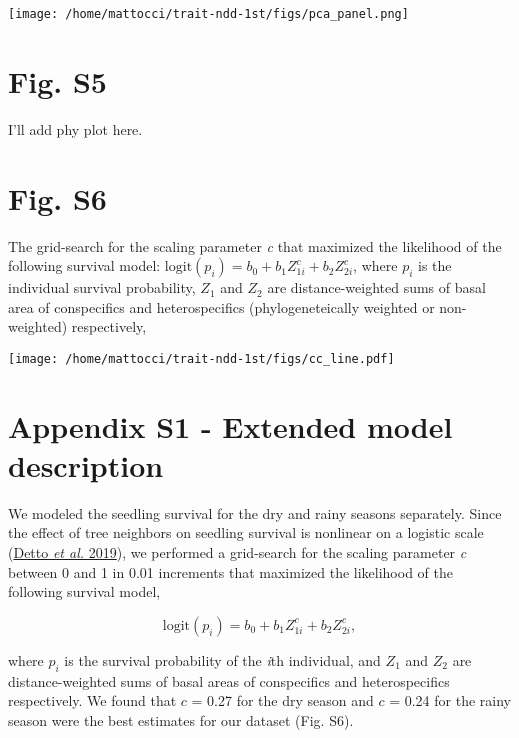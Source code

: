 \documentclass[
  12pt,
  letterpaper,
  DIV=11,
  numbers=noendperiod]{scrartcl}
\begin{document}
\texttt{[image: /home/mattocci/trait-ndd-1st/figs/pca\_panel.png]}

\newpage

\hypertarget{fig.-s5}{%
\section{Fig. S5}\label{fig.-s5}}

I'll add phy plot here.

\newpage

\hypertarget{fig.-s6}{%
\section{Fig. S6}\label{fig.-s6}}

The grid-search for the scaling parameter \emph{c} that maximized the
likelihood of the following survival model:
\(\mathrm{logit}(p_i) = b_0 + b_1 Z_{1i}^c + b_2 Z_{2i}^c\), where
\(p_i\) is the individual survival probability, \(Z_1\) and \(Z_2\) are
distance-weighted sums of basal area of conspecifics and heterospecifics
(phylogeneteically weighted or non-weighted) respectively,

\texttt{[image: /home/mattocci/trait-ndd-1st/figs/cc\_line.pdf]}

\newpage

\hypertarget{appendix-s1---extended-model-description}{%
\section{Appendix S1 - Extended model
description}\label{appendix-s1---extended-model-description}}

We modeled the seedling survival for the dry and rainy seasons
separately. Since the effect of tree neighbors on seedling survival is
nonlinear on a logistic scale (\protect\hyperlink{ref-Detto2019}{Detto
\emph{et al.} 2019}), we performed a grid-search for the scaling
parameter \emph{c} between 0 and 1 in 0.01 increments that maximized the
likelihood of the following survival model,

\[
\mathrm{logit}(p_i) = b_0 + b_1 Z_{1i}^c + b_2 Z_{2i}^c,
\]

where \(p_i\) is the survival probability of the \emph{i}th individual,
and \(Z_1\) and \(Z_2\) are distance-weighted sums of basal areas of
conspecifics and heterospecifics respectively. We found that \(c\) =
0.27 for the dry season and \(c\) = 0.24 for the rainy season were the
best estimates for our dataset (Fig. S6).
\end{document}
